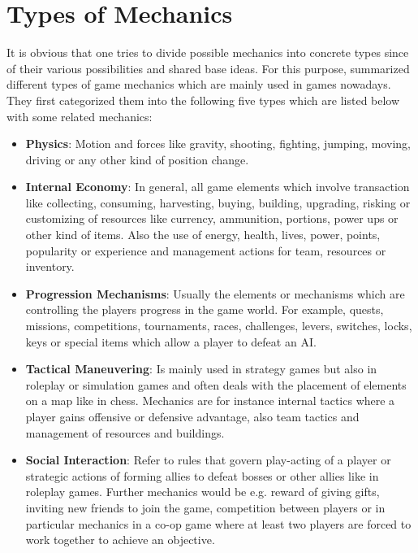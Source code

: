 \documentclass[MGS,Master,english]{twbook}%
\begin{document}
\section{Types of Mechanics}
It is obvious that one tries to divide possible mechanics into concrete types since of their various possibilities and shared base ideas. For this purpose, \cite{gameDesign::gameMechanicsAdvancedGameDesign} summarized different types of game mechanics which are mainly used in games nowadays. They first categorized them into the following five types which are listed below with some related mechanics:
\begin{itemize}
	\item \textbf{Physics}: Motion and forces like gravity, shooting, fighting, jumping, moving, driving or any other kind of position change. \cite{gameDesign::gameMechanicsAdvancedGameDesign}
	\item \textbf{Internal Economy}: In general, all game elements which involve transaction like collecting, consuming, harvesting, buying, building, upgrading, risking or customizing of resources like currency, ammunition, portions, power ups or other kind of items. Also the use of energy, health, lives, power, points, popularity or experience and management actions for team, resources or inventory. \cite{gameDesign::gameMechanicsAdvancedGameDesign}
	\item \textbf{Progression Mechanisms}: Usually the elements or mechanisms which are controlling the players progress in the game world. For example, quests, missions, competitions, tournaments, races, challenges, levers, switches, locks, keys or special items which allow a player to defeat an AI. \cite{gameDesign::gameMechanicsAdvancedGameDesign}
	\item \textbf{Tactical Maneuvering}: Is mainly used in strategy games but also in roleplay or simulation games and often deals with the placement of elements on a map like in chess. Mechanics are for instance internal tactics where a player gains offensive or defensive advantage, also team tactics and management of resources and buildings. \cite{gameDesign::gameMechanicsAdvancedGameDesign}
	\item \textbf{Social Interaction}: Refer to rules that govern play-acting of a player or strategic actions of forming allies to defeat bosses or other allies like in roleplay games. Further mechanics would be e.g. reward of giving gifts, inviting new friends to join the game, competition between players or in particular mechanics in a co-op game where at least two players are forced to work together to achieve an objective. \cite{gameDesign::gameMechanicsAdvancedGameDesign}
\end{itemize}
\end{document}
